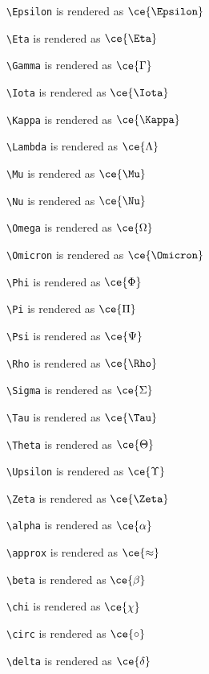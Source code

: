 \texttt{\textbackslash Epsilon} is rendered as $\ce{\Epsilon}$

\texttt{\textbackslash Eta} is rendered as $\ce{\Eta}$

\texttt{\textbackslash Gamma} is rendered as $\ce{\Gamma}$

\texttt{\textbackslash Iota} is rendered as $\ce{\Iota}$

\texttt{\textbackslash Kappa} is rendered as $\ce{\Kappa}$

\texttt{\textbackslash Lambda} is rendered as $\ce{\Lambda}$

\texttt{\textbackslash Mu} is rendered as $\ce{\Mu}$

\texttt{\textbackslash Nu} is rendered as $\ce{\Nu}$

\texttt{\textbackslash Omega} is rendered as $\ce{\Omega}$

\texttt{\textbackslash Omicron} is rendered as $\ce{\Omicron}$

\texttt{\textbackslash Phi} is rendered as $\ce{\Phi}$

\texttt{\textbackslash Pi} is rendered as $\ce{\Pi}$

\texttt{\textbackslash Psi} is rendered as $\ce{\Psi}$

\texttt{\textbackslash Rho} is rendered as $\ce{\Rho}$

\texttt{\textbackslash Sigma} is rendered as $\ce{\Sigma}$

\texttt{\textbackslash Tau} is rendered as $\ce{\Tau}$

\texttt{\textbackslash Theta} is rendered as $\ce{\Theta}$

\texttt{\textbackslash Upsilon} is rendered as $\ce{\Upsilon}$

\texttt{\textbackslash Zeta} is rendered as $\ce{\Zeta}$

\texttt{\textbackslash alpha} is rendered as $\ce{\alpha}$

\texttt{\textbackslash approx} is rendered as $\ce{\approx}$

\texttt{\textbackslash beta} is rendered as $\ce{\beta}$


\texttt{\textbackslash chi} is rendered as $\ce{\chi}$

\texttt{\textbackslash circ} is rendered as $\ce{\circ}$

\texttt{\textbackslash delta} is rendered as $\ce{\delta}$

